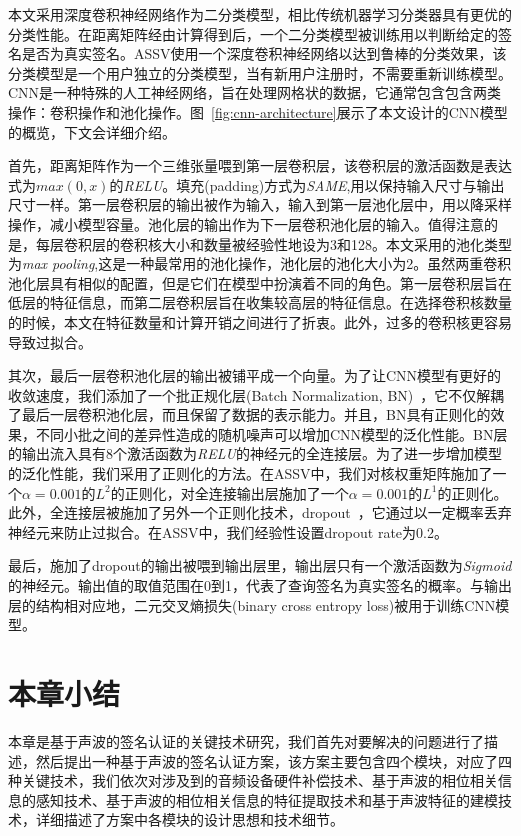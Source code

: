 本文采用深度卷积神经网络作为二分类模型，相比传统机器学习分类器具有更优的分类性能。在距离矩阵经由计算得到后，一个二分类模型被训练用以判断给定的签名是否为真实签名。ASSV使用一个深度卷积神经网络以达到鲁棒的分类效果，该分类模型是一个用户独立的分类模型，当有新用户注册时，不需要重新训练模型。CNN是一种特殊的人工神经网络，旨在处理网格状的数据，它通常包含包含两类操作：卷积操作和池化操作。图~\ref{fig:cnn-architecture}展示了本文设计的CNN模型的概览，下文会详细介绍。

首先，距离矩阵作为一个三维张量喂到第一层卷积层，该卷积层的激活函数是表达式为$max(0,x)$的\textit{RELU}。填充(padding)方式为\textit{SAME},用以保持输入尺寸与输出尺寸一样。第一层卷积层的输出被作为输入，输入到第一层池化层中，用以降采样操作，减小模型容量。池化层的输出作为下一层卷积池化层的输入。值得注意的是，每层卷积层的卷积核大小和数量被经验性地设为3和128。本文采用的池化类型为\textit{max pooling},这是一种最常用的池化操作，池化层的池化大小为2。虽然两重卷积池化层具有相似的配置，但是它们在模型中扮演着不同的角色。第一层卷积层旨在低层的特征信息，而第二层卷积层旨在收集较高层的特征信息。在选择卷积核数量的时候，本文在特征数量和计算开销之间进行了折衷。此外，过多的卷积核更容易导致过拟合。


其次，最后一层卷积池化层的输出被铺平成一个向量。为了让CNN模型有更好的收敛速度，我们添加了一个批正规化层(Batch Normalization, BN)~\cite{ioffe2015batch}，它不仅解耦了最后一层卷积池化层，而且保留了数据的表示能力。并且，BN具有正则化的效果，不同小批之间的差异性造成的随机噪声可以增加CNN模型的泛化性能。BN层的输出流入具有8个激活函数为\textit{RELU}的神经元的全连接层。为了进一步增加模型的泛化性能，我们采用了正则化的方法。在ASSV中，我们对核权重矩阵施加了一个$\alpha=0.001$的$L^2$的正则化，对全连接输出层施加了一个$\alpha=0.001$的$L^1$的正则化。此外，全连接层被施加了另外一个正则化技术，dropout~\cite{srivastava2014dropout}，它通过以一定概率丢弃神经元来防止过拟合。在ASSV中，我们经验性设置dropout rate为0.2。

最后，施加了dropout的输出被喂到输出层里，输出层只有一个激活函数为\textit{Sigmoid}的神经元。输出值的取值范围在0到1，代表了查询签名为真实签名的概率。与输出层的结构相对应地，二元交叉熵损失(binary cross entropy loss)被用于训练CNN模型。

\section{本章小结}
本章是基于声波的签名认证的关键技术研究，我们首先对要解决的问题进行了描述，然后提出一种基于声波的签名认证方案，该方案主要包含四个模块，对应了四种关键技术，我们依次对涉及到的音频设备硬件补偿技术、基于声波的相位相关信息的感知技术、基于声波的相位相关信息的特征提取技术和基于声波特征的建模技术，详细描述了方案中各模块的设计思想和技术细节。


